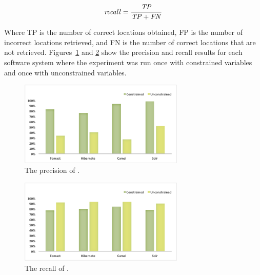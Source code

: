 \begin{equation}\label{recall_eq}
\mathit{recall} = \frac{\mathit{TP}}{{\mathit{TP}+\mathit{FN}}}
\end{equation}


Where TP is the number of correct locations obtained, FP is the number of incorrect locations retrieved, and FN is the number of correct locations that are not retrieved. Figures~\ref{fig:precision} and \ref{fig:recall} show the precision and recall results for each software system where the experiment was run once with constrained variables and once with unconstrained variables.


\begin{figure} [H]
  \centering\includegraphics [width = 0.7\textwidth, height = 0.3\textheight]{Charts/Precision.png}
  \caption{The precision of .}
  \label{fig:precision}
\end{figure}

\begin{figure} [H]
  \centering\includegraphics [width = 0.7\textwidth, height = 0.3\textheight]{Charts/Recall.png}
  \caption{The recall of .}
  \label{fig:recall}
\end{figure}

